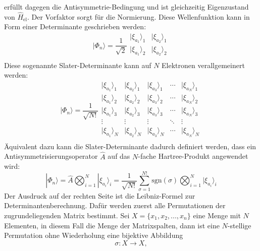 \documentclass[9pt]{report}
\begin{document}
erfüllt dagegen die Antisymmetrie-Bedingung und ist gleichzeitig Eigenzustand von $\hat{H}_{\mathrm{el}}$. Der Vorfaktor sorgt für die Normierung. Diese Wellenfunktion kann in Form einer Determinante geschrieben werden:
\begin{equation}
|\Phi_{n}\rangle = \frac{1}{\sqrt{2}}\begin{array}{|cc|}
|\xi_{a_1}\rangle_1  &  |\xi_{a_2}\rangle_1 \\
|\xi_{a_1}\rangle_2  &  |\xi_{a_2}\rangle_2 \\
\end{array}
\end{equation}
Diese sogenannte Slater-Determinante kann auf $N$ Elektronen verallgemeinert werden:
\begin{equation}
|\Phi_{n}\rangle = \frac{1}{\sqrt{N!}}\begin{array}{|ccccc|}
|\xi_{a_1}\rangle_1  &  |\xi_{a_2}\rangle_1  &  |\xi_{a_3}\rangle_1  & \cdots  &  |\xi_{a_N}\rangle_1 \\
|\xi_{a_1}\rangle_2  &  |\xi_{a_2}\rangle_2  &  |\xi_{a_3}\rangle_2  & \cdots  &  |\xi_{a_N}\rangle_2 \\
|\xi_{a_1}\rangle_3  &  |\xi_{a_2}\rangle_3  &  |\xi_{a_3}\rangle_3  & \cdots  &  |\xi_{a_N}\rangle_3 \\
\vdots  &  \vdots  &  \vdots  & \ddots  &  \vdots \\
|\xi_{a_1}\rangle_N  &  |\xi_{a_2}\rangle_N  &  |\xi_{a_3}\rangle_N  & \cdots  &  |\xi_{a_N}\rangle_N\\
\end{array}
\end{equation}
Äquivalent dazu kann die Slater-Determinante dadurch definiert werden, dass ein Antisymmetrisierungsoperator $\hat{A}$ auf das $N$-fache Hartree-Produkt angewendet wird:
\begin{equation}
|\Phi_{n}\rangle = \hat{A}\bigotimes_{i=1}^{N}|\xi_{a_i}\rangle_i = \frac{1}{\sqrt{N!}}\sum_{\sigma=1}^{N!}\mathrm{sgn}(\sigma)\bigotimes_{i=1}^{N}|\xi_{a_i}\rangle_i
\end{equation}
Der Ausdruck auf der rechten Seite ist die Leibniz-Formel zur Determinantenberechnung. Dafür werden zuerst alle Permutationen der zugrundeliegenden Matrix bestimmt. Sei $X=\{x_1, x_2,...,x_n\}$ eine Menge mit $N$ Elementen, in diesem Fall die Menge der Matrixspalten, dann ist eine $N$-stellige Permutation ohne Wiederholung eine bijektive Abbildung
\begin{equation}
\sigma:X\to X,
\end{equation}
\end{document}
